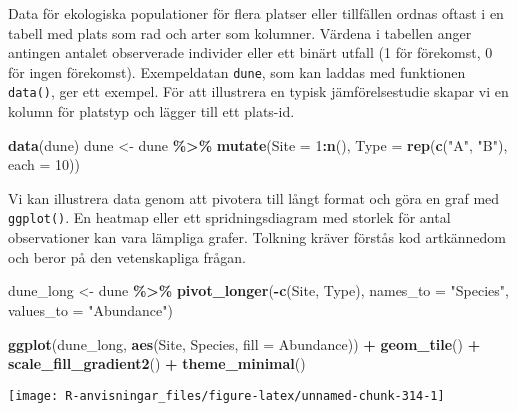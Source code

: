 \documentclass[
]{book}
\newenvironment{Shaded}{\begin{snugshade}}{\end{snugshade}}
\newcommand{\AttributeTok}[1]{\textcolor[rgb]{0.13,0.29,0.53}{#1}}
\newcommand{\DecValTok}[1]{\textcolor[rgb]{0.00,0.00,0.81}{#1}}
\newcommand{\FunctionTok}[1]{\textcolor[rgb]{0.13,0.29,0.53}{\textbf{#1}}}
\newcommand{\NormalTok}[1]{#1}
\newcommand{\OtherTok}[1]{\textcolor[rgb]{0.56,0.35,0.01}{#1}}
\newcommand{\SpecialCharTok}[1]{\textcolor[rgb]{0.81,0.36,0.00}{\textbf{#1}}}
\newcommand{\StringTok}[1]{\textcolor[rgb]{0.31,0.60,0.02}{#1}}
\theoremstyle{definition}
\theoremstyle{definition}
\theoremstyle{definition}
\theoremstyle{definition}
\theoremstyle{remark}
\begin{document}
Data för ekologiska populationer för flera platser eller tillfällen ordnas oftast i en tabell med plats som rad och arter som kolumner. Värdena i tabellen anger antingen antalet observerade individer eller ett binärt utfall (1 för förekomst, 0 för ingen förekomst). Exempeldatan \texttt{dune}, som kan laddas med funktionen \texttt{data()}, ger ett exempel. För att illustrera en typisk jämförelsestudie skapar vi en kolumn för platstyp och lägger till ett plats-id.

\begin{Shaded}
\begin{Highlighting}[]
\FunctionTok{data}\NormalTok{(dune)}
\NormalTok{dune }\OtherTok{\textless{}{-}}\NormalTok{ dune }\SpecialCharTok{\%\textgreater{}\%} 
  \FunctionTok{mutate}\NormalTok{(}\AttributeTok{Site =} \DecValTok{1}\SpecialCharTok{:}\FunctionTok{n}\NormalTok{(), }
         \AttributeTok{Type =} \FunctionTok{rep}\NormalTok{(}\FunctionTok{c}\NormalTok{(}\StringTok{"A"}\NormalTok{, }\StringTok{"B"}\NormalTok{), }\AttributeTok{each =} \DecValTok{10}\NormalTok{))}
\end{Highlighting}
\end{Shaded}

Vi kan illustrera data genom att pivotera till långt format och göra en graf med \texttt{ggplot()}. En heatmap eller ett spridningsdiagram med storlek för antal observationer kan vara lämpliga grafer. Tolkning kräver förstås kod artkännedom och beror på den vetenskapliga frågan.

\begin{Shaded}
\begin{Highlighting}[]
\NormalTok{dune\_long }\OtherTok{\textless{}{-}}\NormalTok{ dune }\SpecialCharTok{\%\textgreater{}\%}
  \FunctionTok{pivot\_longer}\NormalTok{(}\SpecialCharTok{{-}}\FunctionTok{c}\NormalTok{(Site, Type), }\AttributeTok{names\_to =} \StringTok{"Species"}\NormalTok{, }\AttributeTok{values\_to =} \StringTok{"Abundance"}\NormalTok{)}

\FunctionTok{ggplot}\NormalTok{(dune\_long, }\FunctionTok{aes}\NormalTok{(Site, Species, }\AttributeTok{fill =}\NormalTok{ Abundance)) }\SpecialCharTok{+}
  \FunctionTok{geom\_tile}\NormalTok{() }\SpecialCharTok{+}
  \FunctionTok{scale\_fill\_gradient2}\NormalTok{() }\SpecialCharTok{+}
  \FunctionTok{theme\_minimal}\NormalTok{()}
\end{Highlighting}
\end{Shaded}

\begin{center}\texttt{[image: R-anvisningar\_files/figure-latex/unnamed-chunk-314-1]} \end{center}
\end{document}
